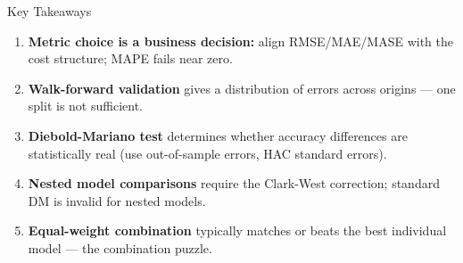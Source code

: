 \documentclass[aspectratio=169, 11pt]{beamer}
\begin{document}
\begin{frame}{Key Takeaways}
  \begin{keybox}
    {\small
    \begin{enumerate}
      \item \textbf{Metric choice is a business decision:} align RMSE/MAE/MASE
            with the cost structure; MAPE fails near zero.
      \item \textbf{Walk-forward validation} gives a distribution of errors
            across origins --- one split is not sufficient.
      \item \textbf{Diebold-Mariano test} determines whether accuracy
            differences are statistically real (use out-of-sample errors,
            HAC standard errors).
      \item \textbf{Nested model comparisons} require the Clark-West correction;
            standard DM is invalid for nested models.
      \item \textbf{Equal-weight combination} typically matches or beats the
            best individual model --- the combination puzzle.
    \end{enumerate}
    }
  \end{keybox}
\end{frame}
\end{document}
